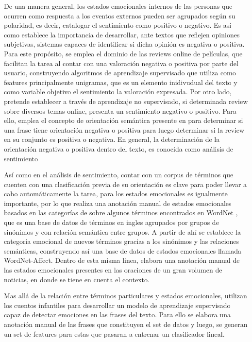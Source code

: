 De una manera general, los estados emocionales internos de las personas que ocurren como respuesta a los eventos externos pueden ser agrupados según su polaridad, es decir, catalogar el sentimiento como positivo o negativo. Es así como  \cite{pang2002thumbs}  establece la importancia de desarrollar, ante textos que reflejen opiniones subjetivas, sistemas capaces de identificar si dicha opinión es negativa o positiva. Para este propósito, se emplea el dominio de las reviews online de películas, que facilitan la tarea al contar con una valoración negativa o positiva por parte del usuario, construyendo algoritmos de aprendizaje supervisado que utiliza como features principalmente unigramas, que es un elemento inidivudual del texto y como variable objetivo el sentimiento la valoración expresada. Por otro lado,  \cite{turney2002thumbs} pretende establecer a través de aprendizaje no supervisado, si determinada review sobre diversos temas online, presenta un sentimiento negativo o positivo. Para ello, emplea el concepto de orientación semántica presente en \cite{hatzivassiloglou1997predicting} para determinar si una frase tiene orientación negativa o positiva para luego determinar si la review en su conjunto es positiva o negativa. En general, la determinación de la orientación negativa o positiva dentro del texto, es conocida como análisis de sentimiento

Así como en el análisis de sentimiento, contar con un corpus de términos que cuenten con una clasificación previa de su orientación es clave para poder llevar a cabo automáticamente la tarea, para los estados emocionales  es igualmente importante, por lo que \cite{strapparava2004wordnet} realiza una anotación manual de estados emocionales basados en las categorías de \cite{ortony1987referential} sobre algunos términos encontrados en WordNet \cite{miller1995wordnet}, que es una base de datos de términos en ingles agrupados por grupos de sinónimos y con relación semántica entre grupos. A partir de ahí se establece la categoría emocional de nuevos términos gracias a los sinónimos y las relaciones semánticas, construyendo así una base de datos de estados emocionales llamada WordNet-Affect. Dentro de esta misma linea, \cite{wiebe2005annotating}  elabora una anotación manual de las estados emocionales presentes en las oraciones de un gran volumen de noticias, en donde se tiene en cuenta el contexto. 

Mas allá de la relación entre términos particulares y estados emocionales, \cite{alm2005emotions} utilizan los cuentos infantiles para desarrollar un modelo de aprendizaje supervisado capaz de detectar emociones en las frases del texto. Para ello se elabora una anotación manual de las frases que constituyen el set de datos y luego, se generan un set de features para estas que pasaran a entrenar un clasificador lineal.



